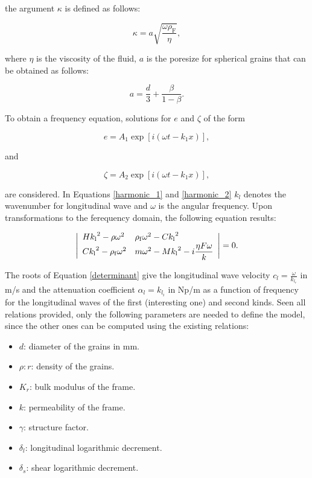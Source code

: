 \documentclass{article}[a4paper, 12pt]
\begin{document}
the argument $\kappa$ is defined as follows:

$$ \kappa = a \sqrt{\frac{\omega\rho_{\mathrm{F}}}{\eta}}, $$

where $\eta$ is the viscosity of the fluid, $a$ is the poresize for spherical grains that can be obtained as follows:

$$ a = \frac{d}{3} + \frac{\beta}{1-\beta}. $$

To obtain a frequency equation, solutions for $e$ and $\zeta$ of the form

\begin{equation}\label{harmonic_1}
    e=A_{1} \exp[ i( \omega t-k_{1} x ) ],
\end{equation}

and 

\begin{equation}\label{harmonic_2}
    \zeta=A_{2} \exp[ i ( \omega t-k_{1} x ) ],
\end{equation}


are considered. In Equations \eqref{harmonic_1} and \eqref{harmonic_2} $k_l$ denotes the wavenumber for longitudinal wave and $\omega$ is the angular frequency. Upon transformations to the ferequency domain, the following equation results:

\begin{equation}\label{determinant}
    \left| \begin{array} {l l} {{H {k_{\mathrm{l}}}^{2}-\rho\omega^{2}}} & {{\rho_{\mathrm{f}} {\omega^{2}-C {k_{\mathrm{l}}}^{2}}}} \\ {{{C k_{\mathrm{l}}}^{2}-{\rho_{\mathrm{f}} \omega^{2}}}} & {{m {\omega^{2}-M {k_{\mathrm{l}}}^{2}-i} {\displaystyle \frac{\eta F \omega} {k}}}} \end{array} \right|=0.
\end{equation}

The roots of Equation \eqref{determinant} give the longitudinal wave velocity $c_l=\frac{\omega}{k_{l_r}}$ in m/s and the attenuation coefficient $\alpha_l=k_{l_i}$ in Np/m as a function of frequency for the longitudinal waves of the first (interesting one) and second kinds. Seen all relations provided, only the following parameters are needed to define the model, since the other ones can be computed using the existing relations:
\begin{itemize}
    \item $d$: diameter of the grains in mm.
    \item $\rho:r$: density of the grains.
    \item $K_r$: bulk modulus of the frame.
    \item $k$: permeability of the frame.
    \item $\gamma$: structure factor.
    \item $\delta_l$: longitudinal logarithmic decrement.
    \item $\delta_s$: shear logarithmic decrement.
\end{itemize}
\end{document}

